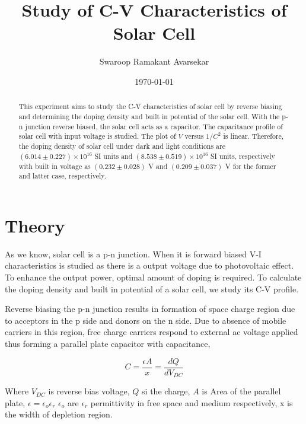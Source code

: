 \documentclass[a4paper, amsfonts, amssymb, amsmath, reprint, showkeys, nofootinbib, twoside]{revtex4-1}
\begin{document}
\title{Study of C-V Characteristics of Solar Cell}
\author{Swaroop Ramakant Avarsekar}
\date{\today}

	
\begin{abstract}
This experiment aims to study the C-V characteristics of solar cell by reverse biasing and determining the doping density and built in potential of the solar cell. With the p-n junction reverse biased, the solar cell acts as a capacitor. The capacitance profile of solar cell with input voltage is studied. The plot of $V$ versus $1/C^{2}$ is linear. Therefore, the doping density of solar cell under dark and light conditions are $(6.014\pm0.227)\times10^{16}$ SI units and $(8.538\pm0.519)\times10^{16}$ SI units, respectively with built in voltage as $(0.232\pm0.028)$ V and $(0.209\pm0.037)$ V for the former and latter case, respectively.
\end{abstract}
	
	
\maketitle

\section{Theory}
As we know, solar cell is a p-n junction. When it is forward biased V-I characteristics is studied as there is a output voltage due to photovoltaic effect. To enhance the output power, optimal amount of doping is required. To calculate the doping density and built in potential of a solar cell, we study its C-V profile. 

Reverse biasing the p-n junction results in formation of space charge region due to acceptors in the p side and donors on the n side. Due to absence of mobile carriers in this region, free charge carriers respond to external ac voltage applied thus forming a parallel plate capacitor with 
capacitance,

\begin{equation}\label{e1}
	C=\frac{\epsilon A}{x}=\frac{dQ}{dV_{DC}}
\end{equation}

Where $V_{DC}$ is reverse bias voltage, $Q$ si the charge, $A$ is Area of the parallel plate, $\epsilon=\epsilon_o\epsilon_r$ $\epsilon_o$ are $\epsilon_r$ permittivity in free space and medium respectively, x is the width of depletion region.
\end{document}
